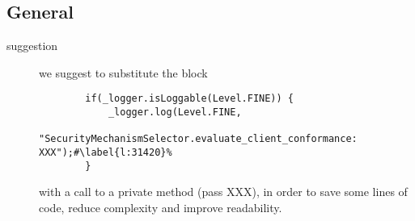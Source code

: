 \subsection{General}

\begin{description}
		 
		
	\item [suggestion] we suggest to substitute  the block \begin{verbatim}
		if(_logger.isLoggable(Level.FINE)) {
		    _logger.log(Level.FINE,
				"SecurityMechanismSelector.evaluate_client_conformance: XXX");#\label{l:31420}%
		}
	\end{verbatim}
	with a call to a private method (pass XXX), in order to save some lines of code, reduce complexity and improve readability.

\end{description}






